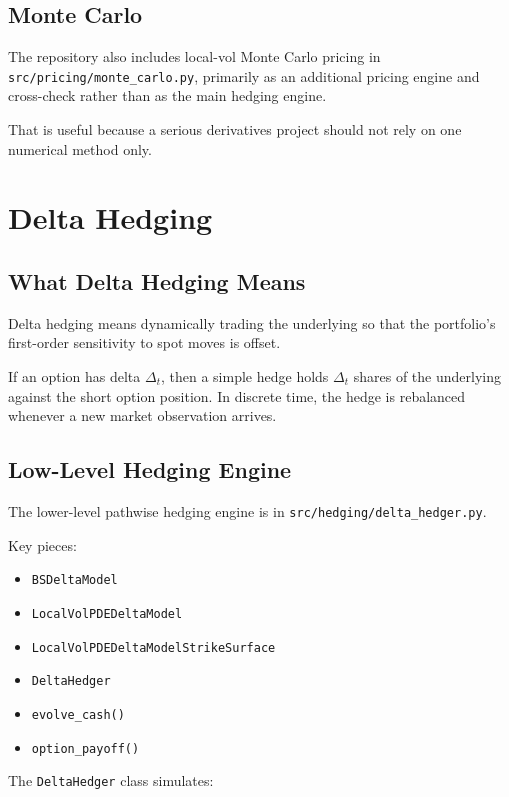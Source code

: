 \documentclass[11pt]{article}
\begin{document}
\subsection{Monte Carlo}

The repository also includes local-vol Monte Carlo pricing in
\texttt{src/pricing/monte\_carlo.py}, primarily as an additional pricing engine and cross-check rather than as the main hedging engine.

That is useful because a serious derivatives project should not rely on one numerical method only.

\section{Delta Hedging}

\subsection{What Delta Hedging Means}

Delta hedging means dynamically trading the underlying so that the portfolio's first-order sensitivity to spot moves is offset.

If an option has delta $\Delta_t$, then a simple hedge holds $\Delta_t$ shares of the underlying against the short option position. In discrete time, the hedge is rebalanced whenever a new market observation arrives.

\subsection{Low-Level Hedging Engine}

The lower-level pathwise hedging engine is in \texttt{src/hedging/delta\_hedger.py}.

Key pieces:

\begin{itemize}
  \item \texttt{BSDeltaModel}
  \item \texttt{LocalVolPDEDeltaModel}
  \item \texttt{LocalVolPDEDeltaModelStrikeSurface}
  \item \texttt{DeltaHedger}
  \item \texttt{evolve\_cash()}
  \item \texttt{option\_payoff()}
\end{itemize}

The \texttt{DeltaHedger} class simulates:
\end{document}

